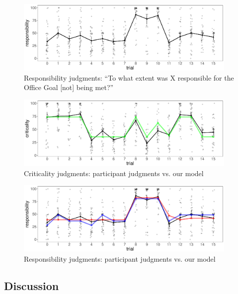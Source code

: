\documentclass[11pt]{article}
\begin{document}
\begin{figure}[H]
	\centering
	\includegraphics[width=0.95\textwidth]{responsibility_judgments}
	\caption{Responsibility judgments: ``To what extent was X responsible for the Office Goal [not] being met?''}
	\label{fig:responsibility_judgments}
\end{figure}

\begin{figure}[H]
	\centering
	\includegraphics[width=0.95\textwidth]{criticality_judgments_model}
	\caption{Criticality judgments: participant judgments vs. our model}
	\label{fig:criticality_judgments_model}
\end{figure}


\begin{figure}[H]
	\centering
	\includegraphics[width=0.95\textwidth]{responsibility_judgments_model}
	\caption{Responsibility judgments: participant judgments vs. our model}
	\label{fig:responsibility_judgments_model}
\end{figure}

\subsection{Discussion}
\label{sub:discussion}
\end{document}
